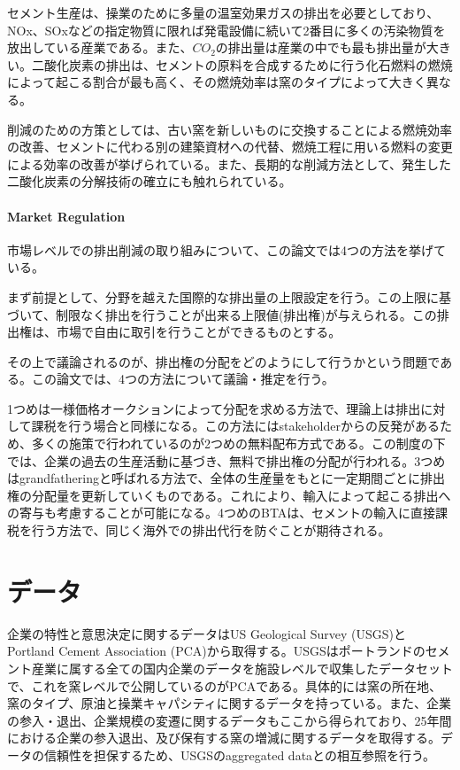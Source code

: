 \documentclass[11pt]{jsarticle}
\begin{document}
セメント生産は、操業のために多量の温室効果ガスの排出を必要としており、NOx、SOxなどの指定物質に限れば発電設備に続いて2番目に多くの汚染物質を放出している産業である。また、$CO_2$の排出量は産業の中でも最も排出量が大きい。二酸化炭素の排出は、セメントの原料を合成するために行う化石燃料の燃焼によって起こる割合が最も高く、その燃焼効率は窯のタイプによって大きく異なる。

削減のための方策としては、古い窯を新しいものに交換することによる燃焼効率の改善、セメントに代わる別の建築資材への代替、燃焼工程に用いる燃料の変更による効率の改善が挙げられている。また、長期的な削減方法として、発生した二酸化炭素の分解技術の確立にも触れられている。

\paragraph{Market Regulation}

市場レベルでの排出削減の取り組みについて、この論文では4つの方法を挙げている。

まず前提として、分野を越えた国際的な排出量の上限設定を行う。この上限に基づいて、制限なく排出を行うことが出来る上限値(排出権)が与えられる。この排出権は、市場で自由に取引を行うことができるものとする。

その上で議論されるのが、排出権の分配をどのようにして行うかという問題である。この論文では、4つの方法について議論・推定を行う。

1つめは一様価格オークションによって分配を求める方法で、理論上は排出に対して課税を行う場合と同様になる。この方法にはstakeholderからの反発があるため、多くの施策で行われているのが2つめの無料配布方式である。この制度の下では、企業の過去の生産活動に基づき、無料で排出権の分配が行われる。3つめはgrandfatheringと呼ばれる方法で、全体の生産量をもとに一定期間ごとに排出権の分配量を更新していくものである。これにより、輸入によって起こる排出への寄与も考慮することが可能になる。4つめのBTAは、セメントの輸入に直接課税を行う方法で、同じく海外での排出代行を防ぐことが期待される。

\section{データ}

企業の特性と意思決定に関するデータはUS Geological Survey (USGS)とPortland Cement Association (PCA)から取得する。USGSはポートランドのセメント産業に属する全ての国内企業のデータを施設レベルで収集したデータセットで、これを窯レベルで公開しているのがPCAである。具体的には窯の所在地、窯のタイプ、原油と操業キャパシティに関するデータを持っている。また、企業の参入・退出、企業規模の変遷に関するデータもここから得られており、25年間における企業の参入退出、及び保有する窯の増減に関するデータを取得する。データの信頼性を担保するため、USGSのaggregated dataとの相互参照を行う。
\end{document}

